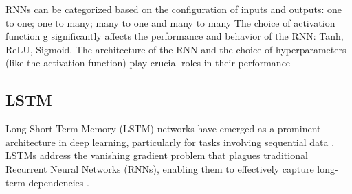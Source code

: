 \documentclass{ieeeojies}
\begin{document}
RNNs can be categorized based on the configuration of inputs and outputs: one to one; one to many; many to one and many to many\cite{b16}
The choice of activation function g significantly affects the performance and behavior of the RNN: Tanh, ReLU, Sigmoid. The architecture of the RNN and the choice of hyperparameters (like the activation function) play crucial roles in their performance\cite{b17}
\subsection{LSTM}

Long Short-Term Memory (LSTM) networks have emerged as a prominent architecture in deep learning, particularly for tasks involving sequential data \cite{b18}. LSTMs address the vanishing gradient problem that plagues traditional Recurrent Neural Networks (RNNs), enabling them to effectively capture long-term dependencies \cite{b19}.
\end{document}
